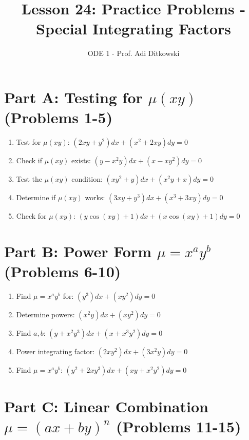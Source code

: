 \documentclass[12pt]{article}
\title{Lesson 24: Practice Problems - Special Integrating Factors}
\author{ODE 1 - Prof. Adi Ditkowski}
\date{}
\begin{document}
\maketitle

\section*{Part A: Testing for $\mu(xy)$ (Problems 1-5)}

\begin{enumerate}
\item Test for $\mu(xy)$: $(2xy + y^2)dx + (x^2 + 2xy)dy = 0$

\item Check if $\mu(xy)$ exists: $(y - x^2y)dx + (x - xy^2)dy = 0$

\item Test the $\mu(xy)$ condition: $(xy^2 + y)dx + (x^2y + x)dy = 0$

\item Determine if $\mu(xy)$ works: $(3xy + y^3)dx + (x^3 + 3xy)dy = 0$

\item Check for $\mu(xy)$: $(y\cos(xy) + 1)dx + (x\cos(xy) + 1)dy = 0$
\end{enumerate}

\section*{Part B: Power Form $\mu = x^a y^b$ (Problems 6-10)}

\begin{enumerate}[start=6]
\item Find $\mu = x^a y^b$ for: $(y^3)dx + (xy^2)dy = 0$

\item Determine powers: $(x^2y)dx + (xy^2)dy = 0$

\item Find $a,b$: $(y + x^2y^3)dx + (x + x^3y^2)dy = 0$

\item Power integrating factor: $(2xy^2)dx + (3x^2y)dy = 0$

\item Find $\mu = x^a y^b$: $(y^2 + 2xy^3)dx + (xy + x^2y^2)dy = 0$
\end{enumerate}

\section*{Part C: Linear Combination $\mu = (ax + by)^n$ (Problems 11-15)}
\end{document}
